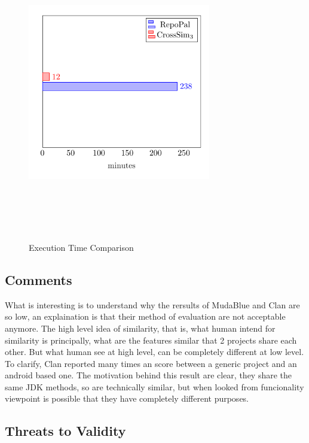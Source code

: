 \begin{figure}[H]
\includegraphics[width=8cm,height=13cm,keepaspectratio]{images/ExecutionTime.pdf}
\centering
\caption{Execution Time Comparison}
\label{fig:LabelC}
\end{figure}

\subsection{Comments}
What is interesting is to understand why the rersults of MudaBlue and Clan are so low, an explaination is that their method of evaluation are not acceptable anymore. The high level idea of similarity, that is, what human intend for similarity is principally, what are the features similar that 2 projects share each other. But what human see at high level, can be completely different at low level. To clarify, Clan reported many times an score between a generic project and an android based one. The motivation behind this result are clear, they share the same JDK methods, so are technically similar, but when looked from funcionality viewpoint is possible that they have completely different purposes.

\subsection{Threats to Validity}\label{sec:threatsValidity}

